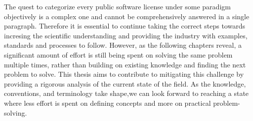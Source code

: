 The quest to categorize every public software license under some paradigm objectively is a complex one and cannot be comprehensively answered in a single paragraph. Therefore it is essential to continue taking the correct steps towards incresing the scientific understanding and providing the industry with examples, standards and processes to follow. However, as the following chapters reveal, a significant amount of effort is still being spent on solving the same problem multiple times, rather than building on existing knowledge and finding the next problem to solve. This thesis aims to contribute to mitigating this challenge by providing a rigorous analysis of the current state of the field. As the knowledge, conventions, and terminology take shape,we can look forward to reaching a state where less effort is spent on defining concepts and more on practical problem-solving.